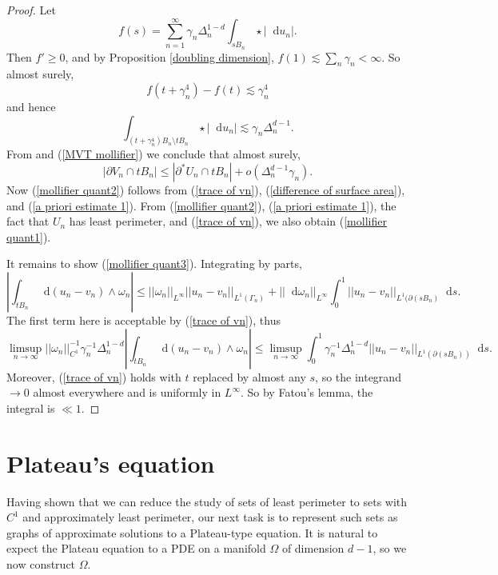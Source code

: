 \documentclass[reqno,12pt,letterpaper]{amsart}
\newcommand*\dif{\mathop{}\!\mathrm{d}}
\theoremstyle{definition}
\numberwithin{equation}{section}
\begin{document}
\begin{proof}
Let
$$f(s) = \sum_{n=1}^\infty \gamma_n \Delta_n^{1 - d} \int_{sB_n} \star |\dif u_n|.$$
Then $f' \geq 0$, and by Proposition \ref{doubling dimension}, $f(1) \lesssim \sum_n \gamma_n < \infty$.
So almost surely,
$$f(t + \gamma_n^4) - f(t) \lesssim \gamma_n^4$$
and hence
$$\int_{(t + \gamma_n^4)B_n \setminus tB_n} \star |\dif u_n| \lesssim \gamma_n \Delta_n^{d - 1}.$$
From \cite[Lemma 7.2]{Giusti77} and (\ref{MVT mollifier}) we conclude that almost surely,
\begin{equation}\label{difference of surface area}
|\partial V_n \cap tB_n| \leq |\partial^* U_n \cap tB_n| + o(\Delta_n^{d - 1} \gamma_n).
\end{equation}
Now (\ref{mollifier quant2}) follows from (\ref{trace of vn}), (\ref{difference of surface area}), and (\ref{a priori estimate 1}).
From (\ref{mollifier quant2}), (\ref{a priori estimate 1}), the fact that $U_n$ has least perimeter, and (\ref{trace of vn}), we also obtain (\ref{mollifier quant1}).

It remains to show (\ref{mollifier quant3}). Integrating by parts,
$$\left|\int_{tB_n} \dif (u_n - v_n) \wedge \omega_n\right| \leq ||\omega_n||_{L^\infty} ||u_n - v_n||_{L^1(\Gamma_n)} + ||\dif \omega_n||_{L^\infty} \int_0^1 ||u_n - v_n||_{L^1(\partial(sB_n)} \dif s.$$
The first term here is acceptable by (\ref{trace of vn}), thus 
$$\limsup_{n \to \infty} ||\omega_n||_{C^1}^{-1} \gamma_n^{-1} \Delta_n^{1 - d} \left|\int_{tB_n} \dif(u_n - v_n) \wedge \omega_n\right| \leq \limsup_{n \to \infty} \int_0^1 \gamma_n^{-1} \Delta_n^{1 - d} ||u_n - v_n||_{L^1(\partial(sB_n))} \dif s.$$
Moreover, (\ref{trace of vn}) holds with $t$ replaced by almost any $s$, so the integrand $\to 0$ almost everywhere and is uniformly in $L^\infty$.
So by Fatou's lemma, the integral is $\ll 1$.
\end{proof}




\section{Plateau's equation}\label{Plateau section}
Having shown that we can reduce the study of sets of least perimeter to sets with $C^1$ and approximately least perimeter, our next task is to represent such sets as graphs of approximate solutions to a Plateau-type equation.
It is natural to expect the Plateau equation to a PDE on a manifold $\Omega$ of dimension $d - 1$, so we now construct $\Omega$.
\end{document}
